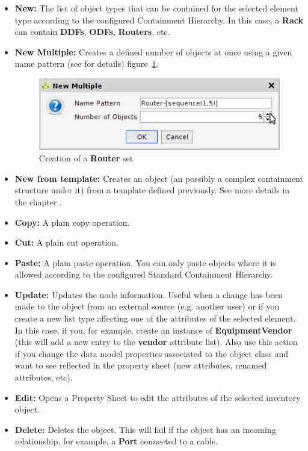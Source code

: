 \documentclass[a4paper]{article}
\begin{document}
	\begin{itemize}
		\item \textbf{New:} The list of object types that can be contained for the selected element type according to the configured Containment Hierarchy. In this case, a \textbf{Rack} can contain \textbf{DDFs}, \textbf{ODFs}, \textbf{Routers}, etc.
		\item \textbf{New Multiple:} Creates a defined number of objects at once using a given name pattern (see \textbf{} for details) figure~\ref{fig:new_multiple}.
			\begin{figure}[h!]
				\centering
				\includegraphics[width=0.5\linewidth]{img/new_multiple.png}
				\caption{Creation of a \textbf{Router} set}
				\label{fig:new_multiple}
			\end{figure}
		\item \textbf{New from template:} Creates an object (an possibly a complex containment structure under it) from a template defined previously. See more details in the chapter .
		\item \textbf{Copy:} A plain copy operation.
		\item \textbf{Cut:} A plain cut operation.
		\item \textbf{Paste:} A plain paste operation. You can only paste objects where it is allowed according to the configured Standard Containment Hierarchy.
		\item \textbf{Update:} Updates the node information. Useful when a change has been made to the object from an external source (e.g. another user) or if you create a new list type affecting one of the attributes of the selected element. In this case, if you, for example, create an instance of \textbf{EquipmentVendor} (this will add a new entry to the \textbf{vendor} attribute list). Also use this action if you change the data model properties associated to the object class and want to see reflected in the property sheet (new attributes, renamed attributes, etc).
		\item \textbf{Edit:} Opens a Property Sheet to edit the attributes of the selected inventory object.
		\item \textbf{Delete:} Deletes the object. This will fail if the object has an incoming relationship, for example, a \textbf{Port} connected to a cable.

\end{itemize}
\end{document}
